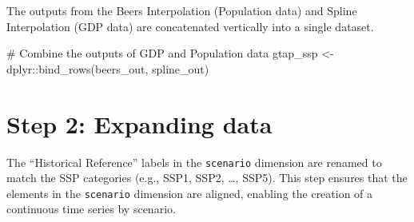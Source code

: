 \documentclass[
  letterpaper,
  DIV=11,
  numbers=noendperiod]{scrartcl}
\newenvironment{Shaded}{}{}
\newcommand{\AttributeTok}[1]{\textcolor[rgb]{0.00,0.34,0.68}{#1}}
\newcommand{\CommentTok}[1]{\textcolor[rgb]{0.54,0.53,0.53}{#1}}
\newcommand{\FunctionTok}[1]{\textcolor[rgb]{0.39,0.29,0.61}{#1}}
\newcommand{\NormalTok}[1]{\textcolor[rgb]{0.12,0.11,0.11}{#1}}
\newcommand{\OtherTok}[1]{\textcolor[rgb]{0.00,0.43,0.16}{#1}}
\newcommand{\SpecialCharTok}[1]{\textcolor[rgb]{0.24,0.68,0.91}{#1}}
\newcommand{\StringTok}[1]{\textcolor[rgb]{0.75,0.01,0.01}{#1}}
\begin{document}
The outputs from the Beers Interpolation (Population data) and Spline
Interpolation (GDP data) are concatenated vertically into a single
dataset.

\begin{Shaded}
\begin{Highlighting}[]
\CommentTok{\# Combine the outputs of GDP and Population data}
\NormalTok{gtap\_ssp }\OtherTok{\textless{}{-}}\NormalTok{ dplyr}\SpecialCharTok{::}\FunctionTok{bind\_rows}\NormalTok{(beers\_out, spline\_out)}
\end{Highlighting}
\end{Shaded}

\section{Step 2: Expanding data}\label{step-2-expanding-data}

The ``Historical Reference'' labels in the \texttt{scenario} dimension
are renamed to match the SSP categories (e.g., SSP1, SSP2, \ldots,
SSP5). This step ensures that the elements in the \texttt{scenario}
dimension are aligned, enabling the creation of a continuous time series
by scenario.

\begin{Shaded}
\end{Shaded}
\end{document}
